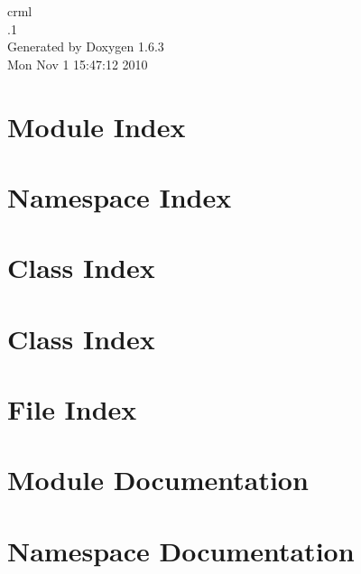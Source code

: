 \documentclass[a4paper]{book}
\begin{document}
\hypersetup{pageanchor=false}
\begin{titlepage}
\vspace*{7cm}
\begin{center}
{\Large crml \\[1ex]\large .1 }\\
\vspace*{1cm}
{\large Generated by Doxygen 1.6.3}\\
\vspace*{0.5cm}
{\small Mon Nov 1 15:47:12 2010}\\
\end{center}
\end{titlepage}
\clearemptydoublepage
{}
\tableofcontents
\clearemptydoublepage
{}
\hypersetup{pageanchor=true}
\chapter{Module Index}

\chapter{Namespace Index}

\chapter{Class Index}

\chapter{Class Index}

\chapter{File Index}

\chapter{Module Documentation}

\chapter{Namespace Documentation}












\end{document}
